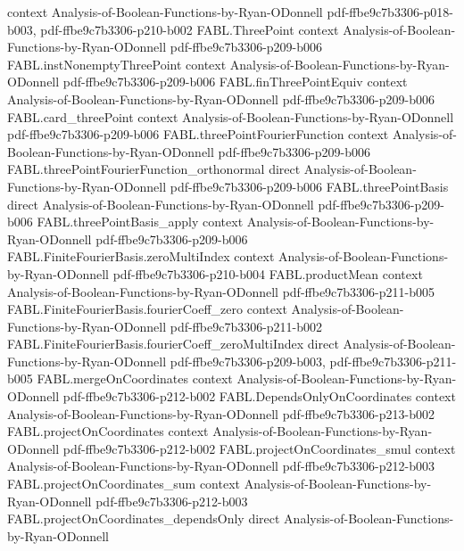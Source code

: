 \begin{theorem}
  {context}
  {Analysis-of-Boolean-Functions-by-Ryan-ODonnell}
  {pdf-ffbe9c7b3306-p018-b003,
    pdf-ffbe9c7b3306-p210-b002}
\proofstep
  {FABL.ThreePoint}
  {context}
  {Analysis-of-Boolean-Functions-by-Ryan-ODonnell}
  {pdf-ffbe9c7b3306-p209-b006}
\proofstep
  {FABL.instNonemptyThreePoint}
  {context}
  {Analysis-of-Boolean-Functions-by-Ryan-ODonnell}
  {pdf-ffbe9c7b3306-p209-b006}
\proofstep
  {FABL.finThreePointEquiv}
  {context}
  {Analysis-of-Boolean-Functions-by-Ryan-ODonnell}
  {pdf-ffbe9c7b3306-p209-b006}
\proofstep
  {FABL.card_threePoint}
  {context}
  {Analysis-of-Boolean-Functions-by-Ryan-ODonnell}
  {pdf-ffbe9c7b3306-p209-b006}
\proofstep
  {FABL.threePointFourierFunction}
  {context}
  {Analysis-of-Boolean-Functions-by-Ryan-ODonnell}
  {pdf-ffbe9c7b3306-p209-b006}
\proofstep
  {FABL.threePointFourierFunction_orthonormal}
  {direct}
  {Analysis-of-Boolean-Functions-by-Ryan-ODonnell}
  {pdf-ffbe9c7b3306-p209-b006}
\proofstep
  {FABL.threePointBasis}
  {direct}
  {Analysis-of-Boolean-Functions-by-Ryan-ODonnell}
  {pdf-ffbe9c7b3306-p209-b006}
\proofstep
  {FABL.threePointBasis_apply}
  {context}
  {Analysis-of-Boolean-Functions-by-Ryan-ODonnell}
  {pdf-ffbe9c7b3306-p209-b006}
\proofstep
  {FABL.FiniteFourierBasis.zeroMultiIndex}
  {context}
  {Analysis-of-Boolean-Functions-by-Ryan-ODonnell}
  {pdf-ffbe9c7b3306-p210-b004}
\proofstep
  {FABL.productMean}
  {context}
  {Analysis-of-Boolean-Functions-by-Ryan-ODonnell}
  {pdf-ffbe9c7b3306-p211-b005}
\proofstep
  {FABL.FiniteFourierBasis.fourierCoeff_zero}
  {context}
  {Analysis-of-Boolean-Functions-by-Ryan-ODonnell}
  {pdf-ffbe9c7b3306-p211-b002}
\proofstep
  {FABL.FiniteFourierBasis.fourierCoeff_zeroMultiIndex}
  {direct}
  {Analysis-of-Boolean-Functions-by-Ryan-ODonnell}
  {pdf-ffbe9c7b3306-p209-b003,
    pdf-ffbe9c7b3306-p211-b005}
\proofstep
  {FABL.mergeOnCoordinates}
  {context}
  {Analysis-of-Boolean-Functions-by-Ryan-ODonnell}
  {pdf-ffbe9c7b3306-p212-b002}
\proofstep
  {FABL.DependsOnlyOnCoordinates}
  {context}
  {Analysis-of-Boolean-Functions-by-Ryan-ODonnell}
  {pdf-ffbe9c7b3306-p213-b002}
\proofstep
  {FABL.projectOnCoordinates}
  {context}
  {Analysis-of-Boolean-Functions-by-Ryan-ODonnell}
  {pdf-ffbe9c7b3306-p212-b002}
\proofstep
  {FABL.projectOnCoordinates_smul}
  {context}
  {Analysis-of-Boolean-Functions-by-Ryan-ODonnell}
  {pdf-ffbe9c7b3306-p212-b003}
\proofstep
  {FABL.projectOnCoordinates_sum}
  {context}
  {Analysis-of-Boolean-Functions-by-Ryan-ODonnell}
  {pdf-ffbe9c7b3306-p212-b003}
\proofstep
  {FABL.projectOnCoordinates_dependsOnly}
  {direct}
  {Analysis-of-Boolean-Functions-by-Ryan-ODonnell}

\end{theorem}
